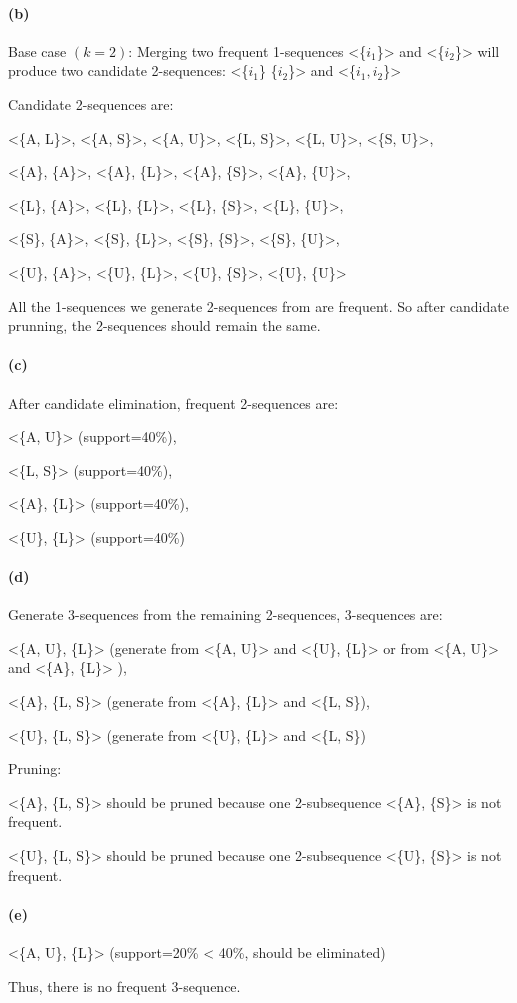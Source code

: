 \documentclass[en,black,normal,10pt]{elegantnote}
\begin{document}
\paragraph*{(b)}

Base case $(k=2)$: Merging two frequent 1-sequences <\{$i_1$\}> and <\{$i_2$\}> will produce two candidate 2-sequences: <\{$i_1$\} \{$i_2$\}> and <\{$i_1 , i_2$\}>

Candidate 2-sequences are:

<\{A, L\}>, <\{A, S\}>, <\{A, U\}>, <\{L, S\}>, <\{L, U\}>, <\{S, U\}>,

<\{A\}, \{A\}>, <\{A\}, \{L\}>, <\{A\}, \{S\}>, <\{A\}, \{U\}>, 

<\{L\}, \{A\}>, <\{L\}, \{L\}>, <\{L\}, \{S\}>, <\{L\}, \{U\}>, 

<\{S\}, \{A\}>, <\{S\}, \{L\}>, <\{S\}, \{S\}>, <\{S\}, \{U\}>, 

<\{U\}, \{A\}>, <\{U\}, \{L\}>, <\{U\}, \{S\}>, <\{U\}, \{U\}>

All the 1-sequences we generate 2-sequences from are frequent. So after candidate prunning, the 2-sequences should remain the same.

\paragraph*{(c)}

After candidate elimination, frequent 2-sequences are:

<\{A, U\}> (support=40\%),

<\{L, S\}> (support=40\%),

<\{A\}, \{L\}> (support=40\%),

<\{U\}, \{L\}> (support=40\%)

\paragraph*{(d)}

Generate 3-sequences from the remaining 2-sequences, 3-sequences are:

<\{A, U\}, \{L\}> (generate from <\{A, U\}> and <\{U\}, \{L\}> or from <\{A, U\}> and <\{A\}, \{L\}> ),

<\{A\}, \{L, S\}> (generate from <\{A\}, \{L\}> and <\{L, S\}),

<\{U\}, \{L, S\}> (generate from <\{U\}, \{L\}> and <\{L, S\})

Pruning:

<\{A\}, \{L, S\}> should be pruned because one 2-subsequence <\{A\}, \{S\}> is not frequent.

<\{U\}, \{L, S\}> should be pruned because one 2-subsequence <\{U\}, \{S\}> is not frequent.

\paragraph*{(e)}

<\{A, U\}, \{L\}> (support=20\% < 40\%, should be eliminated)

Thus, there is no frequent 3-sequence.
\end{document}
